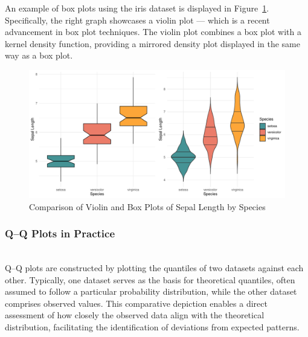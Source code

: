 \documentclass{article}\usepackage[]{graphicx}\usepackage[]{xcolor}
\makeatletter
\def\maxwidth{ %
  \ifdim\Gin@nat@width>\linewidth
    \linewidth
  \else
    \Gin@nat@width
  \fi
}
\newenvironment{knitrout}{}{} %
\numberwithin{equation}{section}
\makeatother
\begin{document}
\noindent
An example of box plots using the iris dataset is displayed in Figure~\ref{fig:box-plots}. Specifically, the right graph showcases a violin plot — which is a recent advancement in box plot techniques. The violin plot combines a box plot with a kernel density function, providing a mirrored density plot displayed in the same way as a box plot.\\
\begin{knitrout}\scriptsize
{}\color{fgcolor}\begin{figure}[h]

{\centering \includegraphics[width=\maxwidth]{figure/beamer-box-plots-1} 

}

\caption[Comparison of Violin and Box Plots of Sepal Length by Species]{Comparison of Violin and Box Plots of Sepal Length by Species}\label{fig:box-plots}
\end{figure}

\end{knitrout}

\subsubsection{Q–Q Plots in Practice}\\

\noindent Q–Q plots are constructed by plotting the quantiles of two datasets against each other. Typically, one dataset serves as the basis for theoretical quantiles, often assumed to follow a particular probability distribution, while the other dataset comprises observed values. This comparative depiction enables a direct assessment of how closely the observed data align with the theoretical distribution, facilitating the identification of deviations from expected patterns.\\
\end{document}
